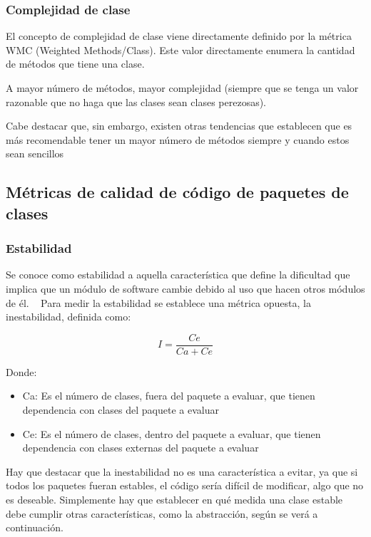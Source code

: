 \documentclass[11pt]{article}
\begin{document}
\subsubsection{Complejidad de clase}

El concepto de complejidad de clase viene directamente definido por la métrica WMC (Weighted Methods/Class). Este valor directamente enumera la cantidad de métodos que tiene una clase. 

A mayor número de métodos, mayor complejidad (siempre que se tenga un valor razonable que no haga que las clases sean clases perezosas).

Cabe destacar que, sin embargo, existen otras tendencias que establecen que es más recomendable tener un mayor número de métodos siempre y cuando estos sean sencillos ~\cite{refactoring:improvingdesign}

\subsection{Métricas de calidad de código de paquetes de clases}

\subsubsection{Estabilidad}
Se conoce como estabilidad a aquella característica que define la dificultad que implica que un módulo de software cambie debido al uso que hacen otros módulos de él. ~\cite{unclebob:stabilityandabstraction}
Para medir la estabilidad se establece una métrica opuesta, la inestabilidad, definida como:

\begin{equation}
I = \frac{Ce}{Ca + Ce}
\end{equation}

Donde:
\begin{itemize}
\item{Ca}: Es el número de clases, fuera del paquete a evaluar, que tienen dependencia con clases del paquete a evaluar
\item{Ce}: Es el número de clases, dentro del paquete a evaluar, que tienen dependencia con clases externas del paquete a evaluar
\end{itemize}

Hay que destacar que la inestabilidad no es una característica a evitar, ya que si todos los paquetes fueran estables, el código sería difícil de modificar, algo que no es deseable. Simplemente hay que establecer en qué medida una clase estable debe cumplir otras características, como la abstracción, según se verá a continuación.
\end{document}
